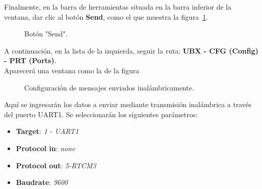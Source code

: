 Finalmente, en la barra de herramientas situada en la barra inferior de la ventana, dar clic al botón \textbf{Send}, como el que muestra la figura~\ref{fig:SendButton}. 

\begin{figure}[H] %
\caption{Botón "Send".}
\label{fig:SendButton}
\end{figure}

A continuación, en la lista de la izquierda, seguir la ruta: \textbf{UBX - CFG (Config) - PRT (Ports)}. \\

Aparecerá una ventana como la de la figura

\begin{figure}[H] %
\caption{Configuración de mensajes enviados inalámbricamente.}
\label{fig:PRT_Base}
\end{figure}

Aquí se ingresarán los datos a enviar mediante transmisión inalámbrica a través del puerto UART1. Se seleccionarán los siguientes parámetros:

\begin{itemize}
\item \textbf{Target}: \textit{1 - UART1}
\item \textbf{Protocol in}: \textit{none}
\item \textbf{Protocol out}: \textit{5-RTCM3}
\item \textbf{Baudrate}: \textit{9600}
\end{itemize}

